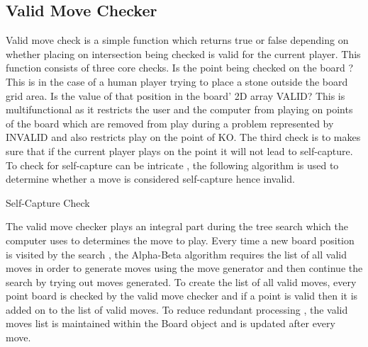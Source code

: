 \documentclass{l4proj}
\begin{document}
\subsection{Valid Move Checker}
Valid move check is a simple function which returns true or false depending on whether placing on intersection being checked is valid for the current player. This function consists of three core checks. Is the point being checked on the board ? This is in the case of a human player trying to place a stone outside the board grid area. Is the value of that position in the board’ 2D array VALID? This is multifunctional as it restricts the user and the computer from playing on points of the board which are removed from play during a problem represented by INVALID and also restricts play on the point of KO. The third check is to makes sure that if the current player plays on the point it will not lead to self-capture. To check for self-capture can be intricate , the following algorithm is used to determine whether a move is considered self-capture hence invalid.

\begin{algorithm}[H]
\caption{Self-Capture Check}\label{Self-Capture Check}
    \DontPrintSemicolon
\end{algorithm}

The valid move checker plays an integral part during the tree search which the computer uses to determines the move to play. Every time a new board position is visited by the search , the Alpha-Beta algorithm requires the list of all valid moves in order to generate moves using the move generator and then continue the search by trying out moves generated. To create the list of all valid moves, every point board is checked by the valid move checker and if a point is valid then it is added on to the list of valid moves. To reduce redundant processing , the valid moves list is maintained within the Board object and is updated after every move.
\end{document}
